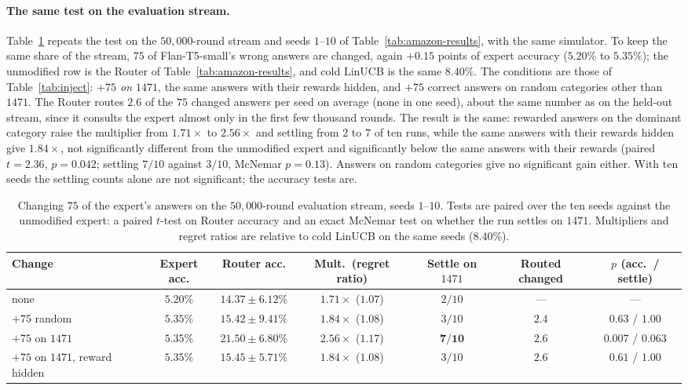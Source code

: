 \documentclass{article}
\theoremstyle{definition}
\theoremstyle{remark}
\theoremstyle{remark}
\begin{document}
\paragraph{The same test on the evaluation stream.}
Table~\ref{tab:inject50k} repeats the test on the $50{,}000$-round stream and
seeds $1$--$10$ of Table~\ref{tab:amazon-results}, with the same simulator.
To keep the same share of the stream, $75$ of Flan-T5-small's wrong answers
are changed, again $+0.15$ points of expert accuracy ($5.20\%$ to $5.35\%$);
the unmodified row is the Router of Table~\ref{tab:amazon-results}, and cold
LinUCB is the same $8.40\%$. The conditions are those of
Table~\ref{tab:inject}: \emph{$+75$ on $1471$}, the same answers with their
rewards hidden, and $+75$ correct answers on random categories other than
$1471$. The Router routes $2.6$ of the $75$ changed answers per seed on
average (none in one seed), about the same number as on the held-out stream,
since it consults the expert almost only in the first few thousand rounds.
The result is the same: rewarded answers on the dominant category raise the
multiplier from $1.71\times$ to $2.56\times$ and settling from $2$ to $7$ of
ten runs, while the same answers with their rewards hidden give $1.84\times$,
not significantly different from the unmodified expert and significantly
below the same answers with their rewards (paired $t=2.36$, $p=0.042$;
settling $7/10$ against $3/10$, McNemar $p=0.13$). Answers on random
categories give no significant gain either. With ten seeds the settling
counts alone are not significant; the accuracy tests are.

\begin{table}[h]
\centering
\caption{Changing $75$ of the expert's answers on the $50{,}000$-round
evaluation stream, seeds $1$--$10$. Tests are paired over the ten seeds
against the unmodified expert: a paired $t$-test on Router accuracy and an
exact McNemar test on whether the run settles on $1471$. Multipliers and
regret ratios are relative to cold LinUCB on the same seeds ($8.40\%$).}
\label{tab:inject50k}
\small
\setlength{\tabcolsep}{4pt}
\begin{tabular}{@{}lcccccc@{}}
\toprule
Change & Expert acc. & Router acc. & Mult.\ (regret ratio) & Settle on $1471$ & Routed changed & $p$ (acc.\ / settle) \\
\midrule
none & $5.20\%$ & $14.37\pm6.12\%$ & $1.71\times$ ($1.07$) & $2/10$ & --- & --- \\
$+75$ random & $5.35\%$ & $15.42\pm9.41\%$ & $1.84\times$ ($1.08$) & $3/10$ & $2.4$ & $0.63$ / $1.00$ \\
$+75$ on $1471$ & $5.35\%$ & $\mathbf{21.50\pm6.80\%}$ & $\mathbf{2.56\times}$ ($\mathbf{1.17}$) & $\mathbf{7/10}$ & $2.6$ & $\mathbf{0.007}$ / $0.063$ \\
$+75$ on $1471$, reward hidden & $5.35\%$ & $15.45\pm5.71\%$ & $1.84\times$ ($1.08$) & $3/10$ & $2.6$ & $0.61$ / $1.00$ \\
\bottomrule
\end{tabular}
\end{table}
\end{document}
